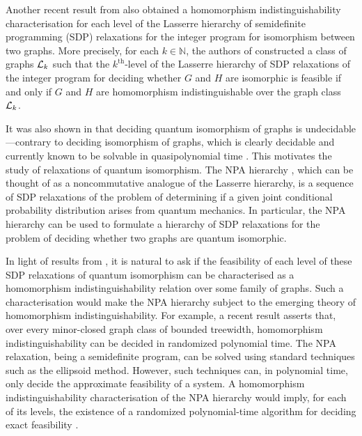 \documentclass[11pt,a4paper]{article}
\theoremstyle{plain}
\theoremstyle{remark}
\theoremstyle{definition}
\begin{document}
Another recent result from \cite{roberson-seppelt-arxiv} also obtained a homomorphism indistinguishability characterisation for each level of the Lasserre hierarchy of semidefinite programming (SDP) relaxations for the integer program for isomorphism between two graphs. 
More precisely, for each $k \in \mathbb{N}$, the authors of \cite{roberson-seppelt-arxiv} constructed a class of graphs ${\mathcal L}_k$ such that the $k^{\text{th}}$-level of the Lasserre hierarchy of SDP relaxations of the integer program for deciding whether $G$ and $H$ are isomorphic is feasible if and only if $G$ and $H$ are homomorphism indistinguishable over the graph class ${\mathcal L}_k$. 





It was also shown in \cite{ATSERIAS2019289} that deciding quantum isomorphism of graphs is undecidable---contrary to deciding isomorphism of graphs, which is clearly decidable and currently known to be solvable in quasipolynomial time \cite{babai_graph_2016}. 
This motivates the study of relaxations of quantum isomorphism. 
The NPA hierarchy \cite{Navascues_2008}, which can be thought of as a noncommutative analogue of the Lasserre hierarchy, is a sequence of SDP relaxations of the problem of determining if a given joint conditional probability distribution arises from quantum mechanics. In particular, the NPA hierarchy can be used to formulate a hierarchy of SDP relaxations for the problem of deciding whether two graphs are quantum isomorphic. 

In light of results from \cite{david-laura,roberson-seppelt-arxiv}, 
it is natural to ask if the feasibility of each level of these SDP relaxations of quantum isomorphism can be characterised as a homomorphism indistinguishability relation over some family of graphs. 
Such a characterisation would make the NPA hierarchy subject to the emerging theory of homomorphism indistinguishability.
For example, a recent result \cite{seppelt_algorithmic_2024} asserts that, over every minor-closed graph class of bounded treewidth, homomorphism indistinguishability can be decided in randomized polynomial time.
The NPA relaxation, being a semidefinite program, can be solved using standard techniques such as the ellipsoid method. However, such techniques can, in polynomial time, only decide the approximate feasibility of a system.
A homomorphism indistinguishability characterisation of the NPA hierarchy would imply, for each of its levels, the existence of a randomized polynomial-time algorithm for deciding exact feasibility \cite{neuen_homomorphism-distinguishing_2023,seppelt_logical_2023,seppelt_algorithmic_2024}.
\end{document}
